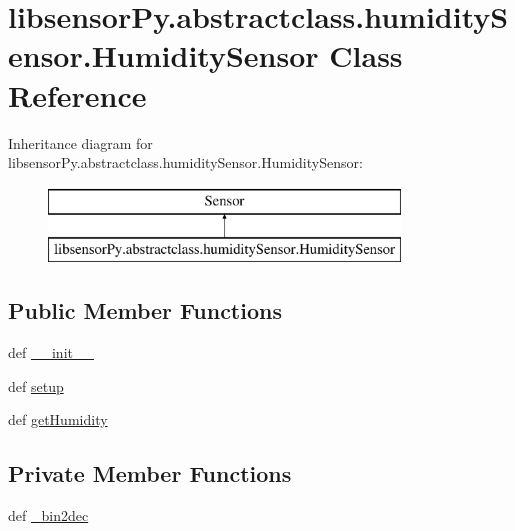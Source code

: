 \hypertarget{classlibsensorPy_1_1abstractclass_1_1humiditySensor_1_1HumiditySensor}{}\section{libsensor\+Py.\+abstractclass.\+humidity\+Sensor.\+Humidity\+Sensor Class Reference}
\label{classlibsensorPy_1_1abstractclass_1_1humiditySensor_1_1HumiditySensor}
Inheritance diagram for libsensor\+Py.\+abstractclass.\+humidity\+Sensor.\+Humidity\+Sensor\+:\begin{figure}[H]
\begin{center}
\leavevmode
\includegraphics[height=2.000000cm]{classlibsensorPy_1_1abstractclass_1_1humiditySensor_1_1HumiditySensor}
\end{center}
\end{figure}
\subsection*{Public Member Functions}
\begin{DoxyCompactItemize}
\item 
def \hyperlink{classlibsensorPy_1_1abstractclass_1_1humiditySensor_1_1HumiditySensor_a8e3b23632257cbf505e753d993615766}{\+\_\+\+\_\+init\+\_\+\+\_\+}
\item 
def \hyperlink{classlibsensorPy_1_1abstractclass_1_1humiditySensor_1_1HumiditySensor_ad4f0ab26e5d13a21f784ab873dfd949e}{setup}
\item 
def \hyperlink{classlibsensorPy_1_1abstractclass_1_1humiditySensor_1_1HumiditySensor_aee439de6e72021ef441e2df2d07be8bb}{get\+Humidity}
\end{DoxyCompactItemize}
\subsection*{Private Member Functions}
\begin{DoxyCompactItemize}
\item 
def \hyperlink{classlibsensorPy_1_1abstractclass_1_1humiditySensor_1_1HumiditySensor_a36060609faedf34134ddae2381453474}{\+\_\+bin2dec}
\end{DoxyCompactItemize}
